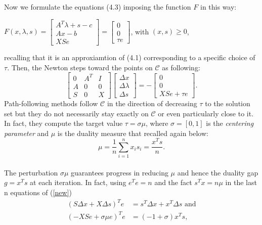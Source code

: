 \documentclass[a4paper,10 pt,titlepage,twoside]{book}
\theoremstyle{plain}
\theoremstyle{definition}
\theoremstyle{remark}
\begin{document}
 Now we formulate the equations (4.3) imposing the function $\mathit{F}$ in this way:
 \begin{center}
 	$\mathit{F}(x,\lambda,s)= \begin{bmatrix}
 	A^{T}\lambda+s-c \\Ax-b \\XSe
 	\end{bmatrix}=\begin{bmatrix} 0\\0\\ \tau e \end{bmatrix}$, with $(x,s)\geq0$,
 \end{center}
recalling that it is an approxiamtion of (4.1) corresponding
to a specific choice of $\tau$. Then, the Newton steps toward the points on $\mathcal{C}$ as following:
 \begin{equation}\label{new}
 \begin{bmatrix}
 0&A^{T}&I \\A&0&0\\S&0&X
 \end{bmatrix}\begin{bmatrix}
 \Delta x\\\Delta\lambda \\\Delta s
 \end{bmatrix}=-\begin{bmatrix}
 0\\0\\XSe + \tau e
 \end{bmatrix}.
 \end{equation}
 Path-following methods follow $\mathcal{C}$ in the direction of decreasing $\tau$ to the solution set but they do not necessarily stay exactly on $\mathcal{C}$ or even particularly close to it. In fact, they compute the target value $\tau = \sigma \mu$, where $\sigma = [0,1]$ is the \textit{centering parameter} and $\mu$ is the duality measure that recalled again below:
 \begin{equation}\label{eq:dm}\tag{4.4}
 \mu = \frac{1}{n}\sum_{i=1}^{n} x_{i}s_{i} = \frac{x^{T}s}{n}.
 \end{equation}\\
 The perturbation $\sigma\mu$ guarantees progress in reducing $\mu$ and hence the duality gap $g = x^{T}s$ at each iteration.
In fact, using $e^{T}e= n$ and the fact $s^{T}x=n\mu$ in the last n equations of (\ref{new})
 \begin{align*}
 (S\Delta x + X\Delta s)^{T}e &= s^{T}\Delta x + x^{T}\Delta s \text{ and}\\
  (- XSe + \sigma \mu e)^{T}e &= (-1 + \sigma)x^{T}s,
 \end{align*}
\end{document}
